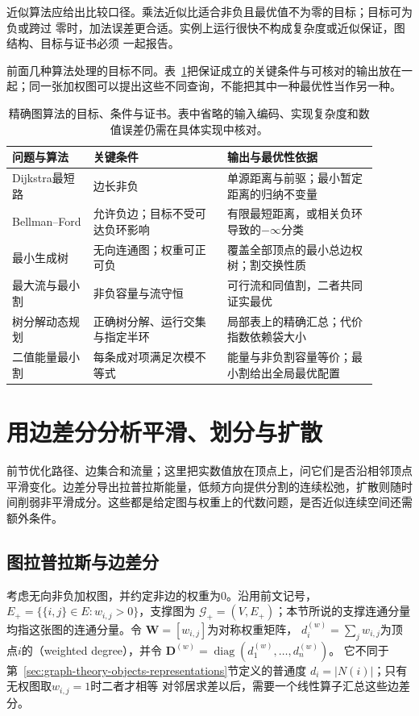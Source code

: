 近似算法应给出比较口径。乘法近似比适合非负且最优值不为零的目标；目标可为负或跨过
零时，加法误差更合适。实例上运行很快不构成复杂度或近似保证，图结构、目标与证书必须
一起报告。

前面几种算法处理的目标不同。表~\ref{tab:graph-algorithm-conditions}把保证成立的关键条件与可核对的输出放在一起；同一张加权图可以提出这些不同查询，不能把其中一种最优性当作另一种。
\begin{table}[htbp]
  \centering
  \caption{精确图算法的目标、条件与证书。表中省略的输入编码、实现复杂度和数值误差仍需在具体实现中核对。}
  \label{tab:graph-algorithm-conditions}
  \begin{tabular}{p{0.20\linewidth}p{0.33\linewidth}p{0.37\linewidth}}
    \toprule
    问题与算法 & 关键条件 & 输出与最优性依据\\
    \midrule
    Dijkstra最短路 & 边长非负 & 单源距离与前驱；最小暂定距离的归纳不变量\\
    Bellman--Ford & 允许负边；目标不受可达负环影响 & 有限最短距离，或相关负环导致的\(-\infty\)分类\\
    最小生成树 & 无向连通图；权重可正可负 & 覆盖全部顶点的最小总边权树；割交换性质\\
    最大流与最小割 & 非负容量与流守恒 & 可行流和同值割，二者共同证实最优\\
    树分解动态规划 & 正确树分解、运行交集与指定半环 & 局部表上的精确汇总；代价指数依赖袋大小\\
    二值能量最小割 & 每条成对项满足次模不等式 & 能量与非负割容量等价；最小割给出全局最优配置\\
    \bottomrule
  \end{tabular}
\end{table}

\section{用边差分分析平滑、划分与扩散}
\label{sec:graph-theory-spectrum-discrete-symmetry}

前节优化路径、边集合和流量；这里把实数值放在顶点上，问它们是否沿相邻顶点平滑变化。边差分导出拉普拉斯能量，低频方向提供分割的连续松弛，扩散则随时间削弱非平滑成分。这些都是给定图与权重上的代数问题，是否近似连续空间还需额外条件。

\subsection{图拉普拉斯与边差分}

考虑无向非负加权图，并约定非边的权重为\(0\)。沿用前文记号，
\(E_+=\{\{i,j\}\in E:w_{i,j}>0\}\)，支撑图为
\(\mathcal{G}_+=(V,E_+)\)；本节所说的支撑连通分量均指这张图的连通分量。令
\(\bm{W}=[w_{i,j}]\)为对称权重矩阵，
\(d_i^{(w)}=\sum_jw_{i,j}\)为顶点\(i\)的（weighted degree），并令
\(\bm{D}^{(w)}=\operatorname{diag}(d_1^{(w)},\ldots,d_n^{(w)})\)。
它不同于第~\ref{sec:graph-theory-objects-representations}节定义的普通度
\(d_i=|N(i)|\)；只有无权图取\(w_{i,j}=1\)时二者才相等
对邻居求差以后，需要一个线性算子汇总这些边差分。

